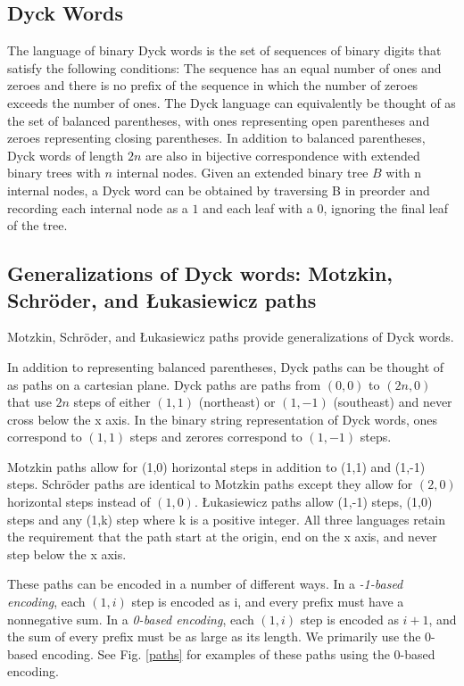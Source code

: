 \subsection{Dyck Words}
The language of binary Dyck words is the set of sequences of binary digits that satisfy the following conditions: The sequence has an equal number of ones and zeroes and there is no prefix of the sequence in which the number of zeroes exceeds the number of ones.  The Dyck language can equivalently be thought of as the set of balanced parentheses, with ones representing open parentheses and zeroes representing closing parentheses.  
In addition to balanced parentheses, Dyck words of length $2n$ are also in bijective correspondence with extended binary trees with $n$ internal nodes. 
Given an extended binary tree $B$ with n internal nodes, a Dyck word can be obtained by traversing B in preorder and recording each internal node as a $1$ and each leaf with a $0$, ignoring the final leaf of the tree.

\subsection{Generalizations of Dyck words: Motzkin, Schröder, and Łukasiewicz paths}
Motzkin, Schröder, and Łukasiewicz paths provide generalizations of Dyck words.  

In addition to representing balanced parentheses, Dyck paths can be thought of as paths on a cartesian plane.  Dyck paths are paths from $(0,0)$ to $(2n,0)$ that use $2n$ steps of either $(1,1)$ (northeast) or $(1,-1)$ (southeast) and never cross below the x axis. In the binary string representation of Dyck words, ones correspond to $(1,1)$ steps and zerores correspond to $(1,-1)$ steps.

Motzkin paths allow for (1,0) horizontal steps in addition to (1,1) and (1,-1) steps. Schröder paths are identical to Motzkin paths except they allow for $(2,0)$ horizontal steps instead of $(1,0)$.  Łukasiewicz paths allow (1,-1) steps, (1,0) steps and any (1,k) step where k is a positive integer.  All three languages retain the requirement that the path start at the origin, end on the x axis, and never step below the x axis. 

These paths can be encoded in a number of different ways.  In a \emph{-1-based encoding}, each $(1,i)$ step is encoded as i, and every prefix must have a nonnegative sum.  In a \emph{0-based encoding}, each $(1,i)$ step is encoded as $i+1$, and the sum of every prefix must be as large as its length. We primarily use the 0-based encoding. See Fig. \ref{paths}  for examples of these paths using the 0-based encoding.

